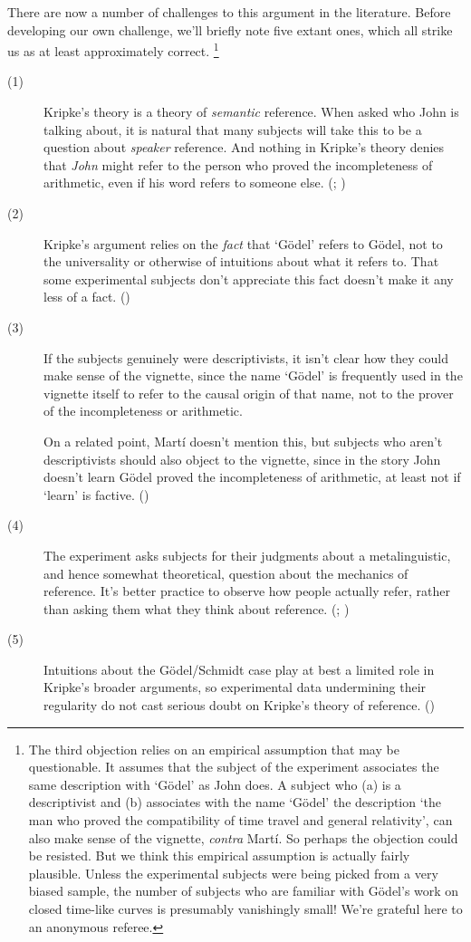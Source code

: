 \documentclass[
  10pt,
  letterpaper,
  DIV=11,
  numbers=noendperiod,
  twoside]{scrartcl}
\begin{document}
There are now a number of challenges to this argument in the literature.
Before developing our own challenge, we'll briefly note five extant
ones, which all strike us as at least approximately correct. \footnote{The
  third objection relies on an empirical assumption that may be
  questionable. It assumes that the subject of the experiment associates
  the same description with `Gödel' as John does. A subject who (a) is a
  descriptivist and (b) associates with the name `Gödel' the description
  `the man who proved the compatibility of time travel and general
  relativity', can also make sense of the vignette, \emph{contra} Martí.
  So perhaps the objection could be resisted. But we think this
  empirical assumption is actually fairly plausible. Unless the
  experimental subjects were being picked from a very biased sample, the
  number of subjects who are familiar with Gödel's work on closed
  time-like curves is presumably vanishingly small! We're grateful here
  to an anonymous referee.}

\begin{description}
\item[(1)]
Kripke's theory is a theory of \emph{semantic} reference. When asked who
John is talking about, it is natural that many subjects will take this
to be a question about \emph{speaker} reference. And nothing in Kripke's
theory denies that \emph{John} might refer to the person who proved the
incompleteness of arithmetic, even if his word refers to someone else.
(;
)
\item[(2)]
Kripke's argument relies on the \emph{fact} that `Gödel' refers to
Gödel, not to the universality or otherwise of intuitions about what it
refers to. That some experimental subjects don't appreciate this fact
doesn't make it any less of a fact. ()
\item[(3)]
If the subjects genuinely were descriptivists, it isn't clear how they
could make sense of the vignette, since the name `Gödel' is frequently
used in the vignette itself to refer to the causal origin of that name,
not to the prover of the incompleteness or arithmetic.

On a related point, Martí doesn't mention this, but subjects who aren't
descriptivists should also object to the vignette, since in the story
John doesn't learn Gödel proved the incompleteness of arithmetic, at
least not if `learn' is factive. ()
\item[(4)]
The experiment asks subjects for their judgments about a metalinguistic,
and hence somewhat theoretical, question about the mechanics of
reference. It's better practice to observe how people actually refer,
rather than asking them what they think about reference.
(; )
\item[(5)]
Intuitions about the Gödel/Schmidt case play at best a limited role in
Kripke's broader arguments, so experimental data undermining their
regularity do not cast serious doubt on Kripke's theory of reference.
()
\end{description}
\end{document}
